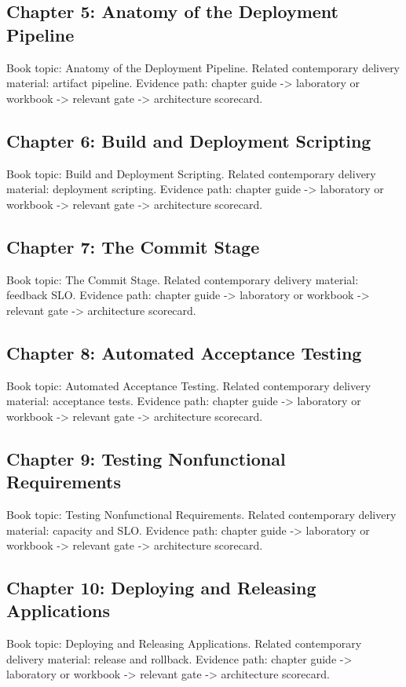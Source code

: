\documentclass[10pt,letterpaper]{article}
\begin{document}
\subsection{Chapter 5: Anatomy of the Deployment Pipeline}
Book topic: Anatomy of the Deployment Pipeline. Related contemporary delivery material: artifact pipeline. Evidence path: chapter guide -> laboratory or workbook -> relevant gate -> architecture scorecard.


\subsection{Chapter 6: Build and Deployment Scripting}
Book topic: Build and Deployment Scripting. Related contemporary delivery material: deployment scripting. Evidence path: chapter guide -> laboratory or workbook -> relevant gate -> architecture scorecard.


\subsection{Chapter 7: The Commit Stage}
Book topic: The Commit Stage. Related contemporary delivery material: feedback SLO. Evidence path: chapter guide -> laboratory or workbook -> relevant gate -> architecture scorecard.


\subsection{Chapter 8: Automated Acceptance Testing}
Book topic: Automated Acceptance Testing. Related contemporary delivery material: acceptance tests. Evidence path: chapter guide -> laboratory or workbook -> relevant gate -> architecture scorecard.


\subsection{Chapter 9: Testing Nonfunctional Requirements}
Book topic: Testing Nonfunctional Requirements. Related contemporary delivery material: capacity and SLO. Evidence path: chapter guide -> laboratory or workbook -> relevant gate -> architecture scorecard.


\subsection{Chapter 10: Deploying and Releasing Applications}
Book topic: Deploying and Releasing Applications. Related contemporary delivery material: release and rollback. Evidence path: chapter guide -> laboratory or workbook -> relevant gate -> architecture scorecard.
\end{document}
